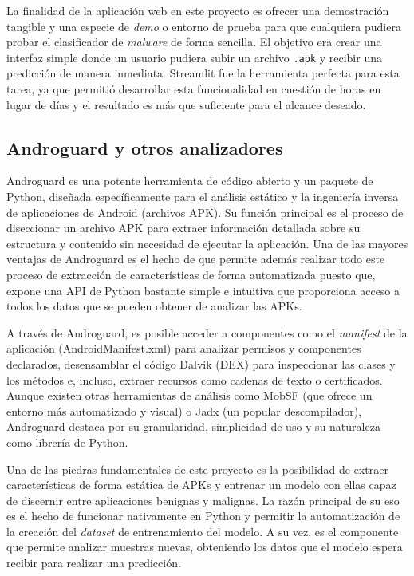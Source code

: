 La finalidad de la aplicación web en este proyecto es ofrecer una demostración tangible y una especie de \textit{demo} o entorno de prueba para que cualquiera pudiera probar el clasificador de \textit{malware} de forma sencilla. El objetivo era crear una interfaz simple donde un usuario pudiera subir un archivo \texttt{.apk} y recibir una predicción de manera inmediata. Streamlit fue la herramienta perfecta para esta tarea, ya que permitió desarrollar esta funcionalidad en cuestión de horas en lugar de días y el resultado es más que suficiente para el alcance deseado.

\subsection{Androguard y otros analizadores}


Androguard es una potente herramienta de código abierto y un paquete de Python, diseñada específicamente para el análisis estático y la ingeniería inversa de aplicaciones de Android (archivos APK). Su función principal es el proceso de diseccionar un archivo APK para extraer información detallada sobre su estructura y contenido sin necesidad de ejecutar la aplicación. Una de las mayores ventajas de Androguard es el hecho de que permite además realizar todo este proceso de extracción de características de forma automatizada puesto que, expone una API de Python bastante simple e intuitiva que proporciona acceso a todos los datos que se pueden obtener de analizar las APKs.

A través de Androguard, es posible acceder a componentes como el \textit{manifest} de la aplicación (AndroidManifest.xml) para analizar permisos y componentes declarados, desensamblar el código Dalvik (DEX) para inspeccionar las clases y los métodos e, incluso, extraer recursos como cadenas de texto o certificados. Aunque existen otras herramientas de análisis como MobSF (que ofrece un entorno más automatizado y visual) o Jadx (un popular descompilador), Androguard destaca por su granularidad, simplicidad de uso y su naturaleza como librería de Python.

Una de las piedras fundamentales de este proyecto es la posibilidad de extraer características de forma estática de APKs y entrenar un modelo con ellas capaz de discernir entre aplicaciones benignas y malignas. La razón principal de su eso es el hecho de funcionar nativamente en Python y permitir la automatización de la creación del \textit{dataset} de entrenamiento del modelo. A su vez, es el componente que permite analizar muestras nuevas, obteniendo los datos que el modelo espera recibir para realizar una predicción.

